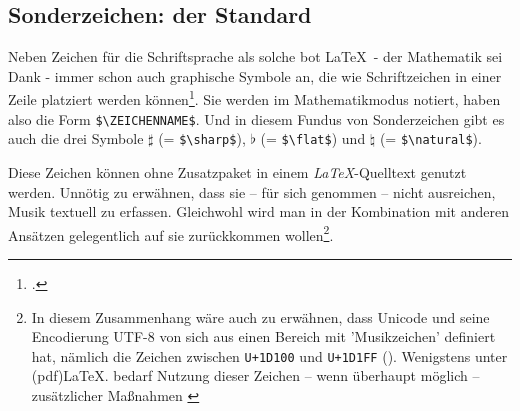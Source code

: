 %
%
%



\subsection{Sonderzeichen: der Standard}

Neben Zeichen für die Schriftsprache als solche bot \LaTeX\ - der
Mathematik sei Dank - immer schon auch graphische Symbole an, die wie
Schriftzeichen in einer Zeile platziert werden können\footcite[vgl.][543ff et
passim]{MitGoo2005a}. Sie werden im Mathematikmodus notiert, haben also die Form
\texttt{\small \$\textbackslash{ZEICHENNAME}\$}. Und in diesem Fundus von Sonderzeichen
gibt es auch die drei Symbole $\sharp$ (= \texttt{\small \$\textbackslash{sharp}\$}),
$\flat$ (= \texttt{\small \$\textbackslash{flat}\$}) und $\natural$ (=
\texttt{\small \$\textbackslash{natural}\$}).

Diese Zeichen können ohne Zusatzpaket in einem \textit{LaTeX}-Quelltext genutzt
werden. Unnötig zu erwähnen, dass sie -- für sich genommen -- nicht ausreichen,
Musik textuell zu erfassen. Gleichwohl wird man in der Kombination mit anderen
Ansätzen gelegentlich auf sie zurückkommen wollen\footnote{In diesem
Zusammenhang wäre auch zu erwähnen, dass Unicode und seine Encodierung UTF-8 von
sich aus einen Bereich mit 'Musikzeichen' definiert hat, nämlich die Zeichen
zwischen \texttt{U+1D100} und \texttt{U+1D1FF} (\cite[Vgl. dazu][\nopage
wp.]{Koellerwirth2015a}). Wenigstens unter (pdf)\LaTeX. bedarf Nutzung dieser
Zeichen -- wenn überhaupt möglich -- zusätzlicher Maßnahmen  \cite[Zum
Zusammenhang zwischen Unicode und UTF( vgl.][\nopage wp.]{Kuhn2019a} }.

%
